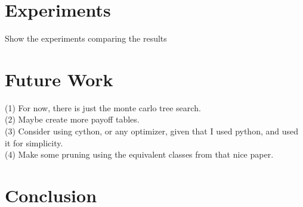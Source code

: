 \documentclass[10pt]{article}
\begin{document}
\section{Experiments}
Show the experiments comparing the results 



\section{Future Work}
(1) For now, there is just the monte carlo tree search.\\
(2) Maybe create more payoff tables.\\
(3) Consider using cython, or any optimizer, given that I used python, and used it for simplicity.\\
(4) Make some pruning using the equivalent classes from that nice paper.



\section{Conclusion}
\end{document}
